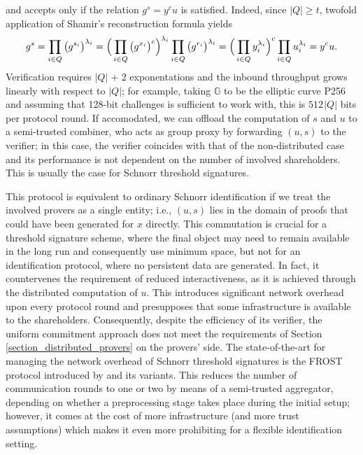\documentclass{iacrtrans}
\begin{document}
and accepts only if the relation
$g ^ s = y ^ c u$ is satisfied.
Indeed, since $|Q| \ge t$,
twofold application of Shamir's reconstruction formula yields
\vspace{5pt}
\begin{equation*}
g ^ s =
\prod_{i \in Q} \big(g ^ {s_i}\big)^{\lambda_i} =
\Big(\prod_{i \in Q}\big(g ^ {x_i}\big)^c\Big)^{\lambda_i} \prod_{i \in Q}\big(g ^ {r_i}\big) ^ {\lambda_i} =
\Big(\prod_{i \in Q}y_i^{\lambda_i}\Big)^c \prod_{i \in Q}u_i^{\lambda_i}=
y^c u.
\vspace{5pt}
\end{equation*}
Verification requires $|Q|\hspace{1pt} +\hspace{1pt} 2$
exponentations and the inbound throughput grows linearly
with respect to $|Q|$; for example,
taking $\mathbb{G}$ to be the elliptic curve P256
and assuming that 128-bit challenges is sufficient to work with,
this is $512 \hspace{1pt} |Q|$ bits per protocol
round. If accomodated, we can offload the computation of $s$ and $u$
to a semi-trusted combiner,
who acts as group proxy by forwarding $(u, s)$ to the verifier;
in this case, the verifier coincides with that of the
non-distributed case and its performance
is not dependent on the number of involved shareholders.
This is usually the case for Schnorr threshold signatures.

This protocol is equivalent to ordinary Schnorr identification
if we treat the involved provers as a single entity;
i.e., $(u, s)$ lies in the domain
of proofs that could have been generated
for $x$ directly.
This commutation is crucial for
a threshold signature scheme,
where the final object may need to
remain available in the long run
and consequently use minimum space,
but not for an identification protocol,
where no persistent data are generated.
In fact, it countervenes the requirement
of reduced interactiveness, as it is achieved through
the distributed computation of $u$.
This introduces significant
network overhead upon every protocol round and
presupposes that some infrastructure is available
to the shareholders.
Consequently, despite the efficiency of its verifier,
the uniform commitment approach does not meet the requirements
of Section \ref{section_distributed_provers} on the provers' side.
The state-of-the-art for managing the network overhead
of Schnorr threshold signatures
is the FROST protocol introduced by \cite{paper_frost}
and its variants.
This reduces the number of communication rounds
to one or two by means of a semi-trusted aggregator,
depending on whether
a preprocessing stage takes place during the initial setup;
however, it comes at the cost of more
infrastructure (and more trust assumptions)
which makes it even more
prohibiting for a flexible identification setting.
\end{document}
